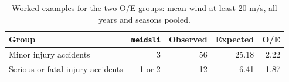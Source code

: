 \begin{table}[htbp]
\centering
\small
\caption[Worked high-wind O/E examples.]{Worked examples for the two O/E groups: mean wind at least 20 m/s, all years and seasons pooled.}
\label{tab:windy-group-examples}
\begin{tabular}{lrrrr}
\toprule
Group & \texttt{meidsli} & Observed & Expected & O/E \\
\midrule
Minor injury accidents & 3 & 56 & 25.18 & 2.22 \\ \grayhline
Serious or fatal injury accidents & 1 or 2 & 12 & 6.41 & 1.87 \\
\bottomrule
\end{tabular}
\end{table}
